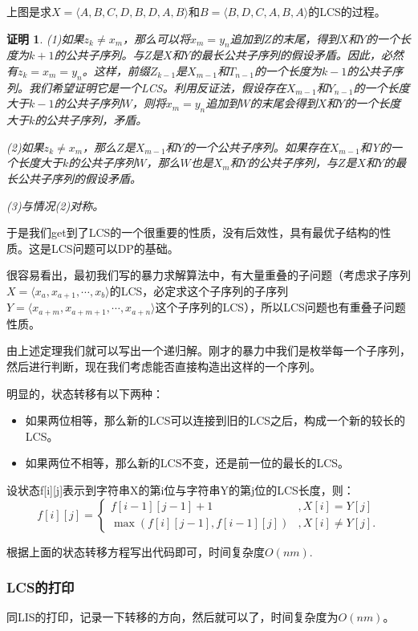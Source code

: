 \documentclass{article}
\theoremstyle{nonumberplain}
\newtheorem{Proof}{证明}
\begin{document}
上图是求$X=\langle A, B, C, D, B, D, A, B\rangle$和$B=\langle B, D, C, A, B, A\rangle$的LCS的过程。

\begin{Proof}
	(1)如果$z_k\neq x_m$，那么可以将$x_m=y_n$追加到$Z$的末尾，得到$X$和$Y$的一个长度为$k+1$的公共子序列。与$Z$是$X$和$Y$的最长公共子序列的假设矛盾。因此，必然有$z_k=x_m=y_n$。这样，前缀$Z_{k-1}$是$X_{m-1}$和$T_{n-1}$的一个长度为$k-1$的公共子序列。我们希望证明它是一个LCS。利用反证法，假设存在$X_{m-1}$和$Y_{n-1}$的一个长度大于$k-1$的公共子序列$W$，则将$x_m=y_n$追加到$W$的末尾会得到$X$和$Y$的一个长度大于$k$的公共子序列，矛盾。

	(2)如果$z_k\neq x_m$，那么$Z$是$X_{m-1}$和$Y$的一个公共子序列。如果存在$X_{m-1}$和Y的一个长度大于$k$的公共子序列$W$，那么$W$也是$X_m$和$Y$的公共子序列，与$Z$是$X$和$Y$的最长公共子序列的假设矛盾。

	(3)与情况(2)对称。\ 
\end{Proof}

于是我们get到了LCS的一个很重要的性质，没有后效性，具有最优子结构的性质。这是LCS问题可以DP的基础。

很容易看出，最初我们写的暴力求解算法中，有大量重叠的子问题（考虑求子序列$X = \langle x_a, x_{a+1}, \cdots, x_b\rangle$的LCS，必定求这个子序列的子序列$Y = \langle x_{a+m}, x_{a+m+1}, \cdots, x_{a+n}\rangle$这个子序列的LCS），所以LCS问题也有重叠子问题性质。

由上述定理我们就可以写出一个递归解。刚才的暴力中我们是枚举每一个子序列，然后进行判断，现在我们考虑能否直接构造出这样的一个序列。

明显的，状态转移有以下两种：
\begin{itemize}
	\item{如果两位相等，那么新的LCS可以连接到旧的LCS之后，构成一个新的较长的LCS。}
	\item{如果两位不相等，那么新的LCS不变，还是前一位的最长的LCS。}
\end{itemize}
设状态f[i][j]表示到字符串X的第i位与字符串Y的第j位的LCS长度，则：
\begin{equation*}
	f[i][j]=\begin{cases}
		f[i-1][j-1]+1             & , X[i]=Y[j]     \\
		\max(f[i][j-1],f[i-1][j]) & , X[i]\neq Y[j].
	\end{cases}
\end{equation*}

根据上面的状态转移方程写出代码即可，时间复杂度$O(nm)$.
\subsubsection{LCS的打印}
同LIS的打印，记录一下转移的方向，然后就可以了，时间复杂度为$O(nm)$。
\end{document}

